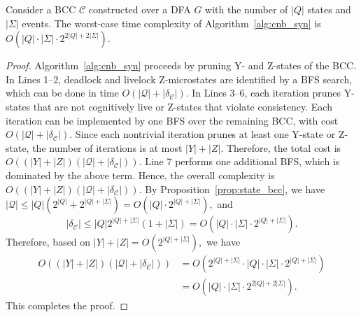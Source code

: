 \documentclass[journal,twoside,web]{ieeecolor}
\begin{document}
\begin{proposition}
Consider a BCC $\mathcal{C}$ constructed over a DFA $G$ with the number of $|Q|$ states and $|\Sigma|$ events. 
The worst-case time complexity of Algorithm~\ref{alg:cnb_syn} is
$
    O(|Q|\cdot |\Sigma|\cdot 2^{2|Q|+2|\Sigma|}).
$
\end{proposition}

\begin{proof}
Algorithm~\ref{alg:cnb_syn} proceeds by pruning Y- and Z-states of the BCC.
In Lines 1--2, deadlock and livelock Z-microstates are identified by a BFS
search, which can be done in time
$
O(|\bm{\mathcal{Q}}|+|\delta_{\mathcal{C}}|)
$.
%
In Lines 3--6, each iteration prunes Y-states that are not cognitively live
or Z-states that violate consistency. Each iteration can be implemented by one
BFS over the remaining BCC, with cost
$
O(|\bm{\mathcal{Q}}|+|\delta_{\mathcal{C}}|)
$.
Since each nontrivial iteration prunes at least one Y-state or Z-state, the
number of iterations is at most $|Y|+|Z|$. Therefore, the total cost is
$
    O((|Y|+|Z|)(|\bm{\mathcal{Q}}|+|\delta_{\mathcal{C}}|)).
$
Line 7 performs one additional BFS, which is dominated by the above term.
Hence, the overall complexity is
$
    O((|Y|+|Z|)(|\bm{\mathcal{Q}}|+|\delta_{\mathcal{C}}|)).
$
%
By Proposition~\ref{prop:state_bcc}, we have
$
    |\bm{\mathcal{Q}}|
    \le
    |Q|(2^{|Q|}+2^{|Q|+|\Sigma|})
    =
    O(|Q|\cdot 2^{|Q|+|\Sigma|}),
$
and
$$
    |\delta_{\mathcal{C}}|
    \le
    |Q|2^{|Q|+|\Sigma|}(1+|\Sigma|)
    =
    O(|Q|\cdot |\Sigma|\cdot 2^{|Q|+|\Sigma|}).
$$
Therefore, based on
$
|Y|+|Z| = O(2^{|Q|+|\Sigma|}),
$
we have
$$
\begin{aligned}
    O((|Y|+|Z|)(|\bm{\mathcal{Q}}|+|\delta_{\mathcal{C}}|))
    &=
    O(
    2^{|Q|+|\Sigma|}
    \cdot
    |Q|\cdot |\Sigma|\cdot 2^{|Q|+|\Sigma|}
    ) \\
    &=
    O(|Q|\cdot |\Sigma|\cdot 2^{2|Q|+2|\Sigma|}).
\end{aligned}
$$
This completes the proof.
\end{proof}
%
\end{document}
